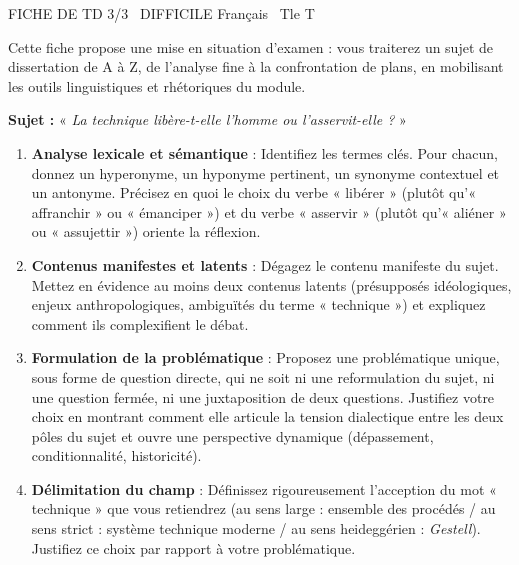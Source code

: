 \documentclass[11pt]{article}
\begin{document}
\begin{tcolorbox}[enhanced,colback=popink,colframe=popink,arc=10pt,boxrule=0pt,left=12pt,right=12pt,top=9pt,bottom=9pt]
{\color{white}\popxbold\small FICHE DE TD 3/3 \textbullet\ DIFFICILE \hfill Français \textbullet\ Tle T\par}
\end{tcolorbox}
\vspace{4pt}
Cette fiche propose une mise en situation d'examen : vous traiterez un sujet de dissertation de A à Z, de l'analyse fine à la confrontation de plans, en mobilisant les outils linguistiques et rhétoriques du module.

\begin{exercice}
\textbf{Sujet :} « \textit{La technique libère-t-elle l'homme ou l'asservit-elle ?} »

\begin{enumerate}
    \item \textbf{Analyse lexicale et sémantique} : Identifiez les termes clés. Pour chacun, donnez un hyperonyme, un hyponyme pertinent, un synonyme contextuel et un antonyme. Précisez en quoi le choix du verbe « libérer » (plutôt qu'« affranchir » ou « émanciper ») et du verbe « asservir » (plutôt qu'« aliéner » ou « assujettir ») oriente la réflexion.
    \item \textbf{Contenus manifestes et latents} : Dégagez le contenu manifeste du sujet. Mettez en évidence au moins deux contenus latents (présupposés idéologiques, enjeux anthropologiques, ambiguïtés du terme « technique ») et expliquez comment ils complexifient le débat.
    \item \textbf{Formulation de la problématique} : Proposez une problématique unique, sous forme de question directe, qui ne soit ni une reformulation du sujet, ni une question fermée, ni une juxtaposition de deux questions. Justifiez votre choix en montrant comment elle articule la tension dialectique entre les deux pôles du sujet et ouvre une perspective dynamique (dépassement, conditionnalité, historicité).
    \item \textbf{Délimitation du champ} : Définissez rigoureusement l'acception du mot « technique » que vous retiendrez (au sens large : ensemble des procédés / au sens strict : système technique moderne / au sens heideggérien : \textit{Gestell}). Justifiez ce choix par rapport à votre problématique.
\end{enumerate}
\end{exercice}
\end{document}
